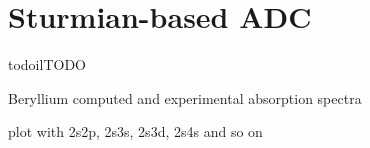 \section{Sturmian-based ADC}
todoil{TODO}
%
%



Beryllium computed and experimental absorption spectra~\cite{Serrao1985}

plot with 2s2p, 2s3s, 2s3d, 2s4s and so on



%
